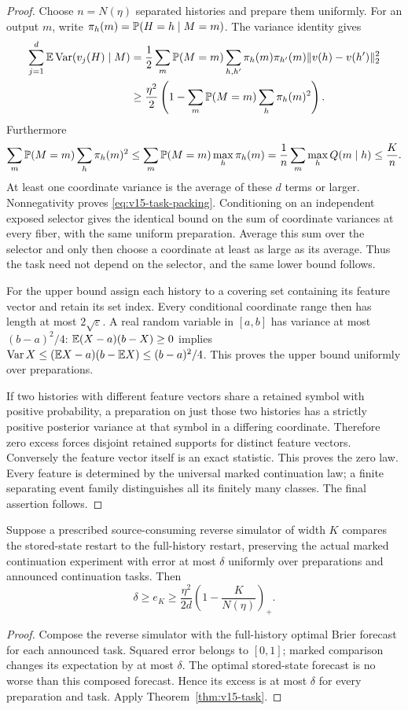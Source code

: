 \begin{proof}
Choose $n=N(\eta)$ separated histories and prepare them uniformly.
For an output $m$, write $\pi_h(m)=\mathbb P(H=h\mid M=m)$. The variance
identity gives
\begin{align*}
 \sum_{j=1}^d\mathbb E\operatorname{Var}(v_j(H)\mid M)
 &=\frac12\sum_m\mathbb P(M=m)
        \sum_{h,h'}\pi_h(m)\pi_{h'}(m)\|v(h)-v(h')\|_2^2\\
 &\ge\frac{\eta^2}{2}
       \left(1-\sum_m\mathbb P(M=m)\sum_h\pi_h(m)^2\right).
\end{align*}
Furthermore
\[
 \sum_m\mathbb P(M=m)\sum_h\pi_h(m)^2
 \le\sum_m\mathbb P(M=m)\max_h\pi_h(m)
 =\frac1n\sum_m\max_h Q(m\mid h)\le\frac K n.
\]
At least one coordinate variance is the average of these $d$ terms
or larger. Nonnegativity proves \eqref{eq:v15-task-packing}.
Conditioning on an independent exposed selector gives the identical
bound on the sum of coordinate variances at every fiber, with the same
uniform preparation. Average this sum over the selector and only then
choose a coordinate at least as large as its average. Thus the task
need not depend on the selector, and the same lower bound follows.

For the upper bound assign each history to a covering set containing
its feature vector and retain its set index. Every conditional
coordinate range then has length at most $2\sqrt\varepsilon$.
A real random variable in $[a,b]$ has variance at most $(b-a)^2/4$:
$\mathbb E(X-a)(b-X)\ge0$ implies
$\operatorname{Var} X\le(\mathbb E X-a)(b-\mathbb E X)\le(b-a)^2/4$.
This proves the upper bound uniformly over preparations.

If two histories with different feature vectors share a retained
symbol with positive probability, a preparation on just those two
histories has a strictly positive posterior variance at that symbol
in a differing coordinate. Therefore zero excess forces disjoint
retained supports for distinct feature vectors. Conversely the feature
vector itself is an exact statistic. This proves the zero law.
Every feature is determined by the universal marked continuation law;
a finite separating event family distinguishes all its finitely many
classes. The final assertion follows.
\end{proof}

\begin{corollary}
\label{cor:v15-task-deficiency}
Suppose a prescribed source-consuming reverse simulator of width $K$
compares the stored-state restart to the full-history restart, preserving
the actual marked continuation experiment with error at most $\delta$
uniformly over preparations and announced continuation tasks. Then
\[
 \delta\ge e_K\ge
       \frac{\eta^2}{2d}\left(1-\frac K{N(\eta)}\right)_+.
\]
\end{corollary}
\begin{proof}
Compose the reverse simulator with the full-history optimal Brier
forecast for each announced task. Squared error belongs to $[0,1]$;
marked comparison changes its expectation by at most $\delta$.
The optimal stored-state forecast is no worse than this composed
forecast. Hence its excess is at most $\delta$ for every preparation
and task. Apply Theorem~\ref{thm:v15-task}.
\end{proof}

